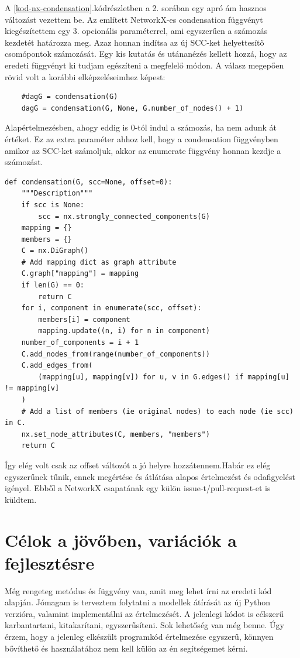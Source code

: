 \documentclass[
]{thesis-ekf}
\theoremstyle{definition}
\theoremstyle{remark}
\begin{document}
	A \ref{kod-nx-condensation}.kódrészletben a 2. sorában egy apró ám hasznos változást vezettem be. Az említett NetworkX-es condensation függvényt kiegészítettem egy 3. opcionális paraméterrel, ami egyszerűen a számozás kezdetét határozza meg. Azaz honnan indítsa az új SCC-ket helyettesítő csomópontok számozását. Egy kis kutatás és utánanézés kellett hozzá, hogy az eredeti függvényt ki tudjam egészíteni a megfelelő módon. A válasz megepően rövid volt a korábbi elképzeléseimhez képest:

\begin{lstlisting}
	#dagG = condensation(G)
	dagG = condensation(G, None, G.number_of_nodes() + 1)
\end{lstlisting}

	Alapértelmezésben, ahogy eddig is 0-tól indul a számozás, ha nem adunk át értéket. Ez az extra paraméter ahhoz kell, hogy a condensation függvényben amikor az SCC-ket számoljuk, akkor az enumerate függvény honnan kezdje a számozást.

\begin{lstlisting}
def condensation(G, scc=None, offset=0):
	"""Description"""
	if scc is None:
		scc = nx.strongly_connected_components(G)
	mapping = {}
	members = {}
	C = nx.DiGraph()
	# Add mapping dict as graph attribute
	C.graph["mapping"] = mapping
	if len(G) == 0:
		return C
	for i, component in enumerate(scc, offset):
		members[i] = component
		mapping.update((n, i) for n in component)
	number_of_components = i + 1
	C.add_nodes_from(range(number_of_components))
	C.add_edges_from(
		(mapping[u], mapping[v]) for u, v in G.edges() if mapping[u] != mapping[v]
	)
	# Add a list of members (ie original nodes) to each node (ie scc) in C.
	nx.set_node_attributes(C, members, "members")
	return C	
\end{lstlisting}
	Így elég volt csak az offset változót a jó helyre hozzátennem.Habár ez elég egyszerűnek tűnik, ennek megértése és átlátása alapos értelmezést és odafigyelést igényel. Ebből a NetworkX csapatának egy külön issue-t/pull-request-et is küldtem. %

	\section{Célok a jövőben, variációk a fejlesztésre}
	
	Még rengeteg metódus és függvény van, amit meg lehet írni az eredeti kód \cite{github-py08} alapján. Jómagam is terveztem folytatni a modellek átírását az új Python verzióra, valamint implementálni az értelmezését. A jelenlegi kódot is célszerű karbantartani, kitakarítani, egyszerűsíteni. Sok lehetőség van még benne. Úgy érzem, hogy a jelenleg elkészült programkód értelmezése egyszerű, könnyen bővíthető és használatához nem kell külön az én segítségemet kérni.
	
\end{document}
